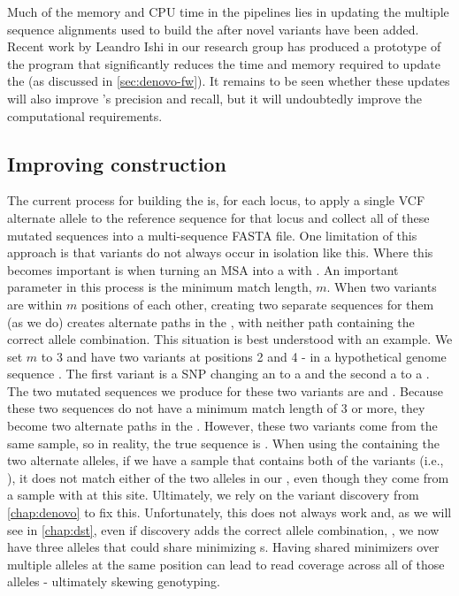 Much of the memory and CPU time in the \pandora{} pipelines lies in updating the multiple sequence alignments used to build the \prg{} after novel variants have been added. Recent work by Leandro Ishi in our research group has produced a prototype of the \makeprg{} program that significantly reduces the time and memory required to update the \prg{} (as discussed in \autoref{sec:denovo-fw}). It remains to be seen whether these updates will also improve \pandora{}'s precision and recall, but it will undoubtedly improve the computational requirements. 

\subsection{Improving \prg{} construction}
\label{sec:improve-prg}
The current process for building the \mtb{} \prg{} is, for each locus, to apply a single VCF alternate allele to the reference sequence for that locus and collect all of these mutated sequences into a multi-sequence FASTA file. One limitation of this approach is that variants do not always occur in isolation like this. Where this becomes important is when turning an MSA into a \prg{} with \makeprg{}. An important parameter in this process is the minimum match length, $m$. When two variants are within $m$ positions of each other, creating two separate sequences for them (as we do) creates alternate paths in the \prg{}, with neither path containing the correct allele combination. This situation is best understood with an example. We set $m$ to 3 and have two variants at positions 2 and 4 - in a hypothetical genome sequence . The first variant is a SNP changing an  to a  and the second a  to a . The two mutated sequences we produce for these two variants are  and . Because these two sequences do not have a minimum match length of 3 or more, they become two alternate paths in the \prg{}. However, these two variants come from the same sample, so in reality, the true sequence is . When using the \prg{} containing the two alternate alleles, if we have a sample that contains both of the variants (i.e., ), it does not match either of the two alleles in our \prg{}, even though they come from a sample with  at this site. Ultimately, we rely on the \denovo{} variant discovery from \autoref{chap:denovo} to fix this. Unfortunately, this does not always work and, as we will see in \autoref{chap:dst}, even if \denovo{} discovery adds the correct allele combination, , we now have three alleles that could share minimizing \kmer{}s. Having shared minimizers over multiple alleles at the same position can lead to read coverage across all of those alleles - ultimately skewing genotyping. 

